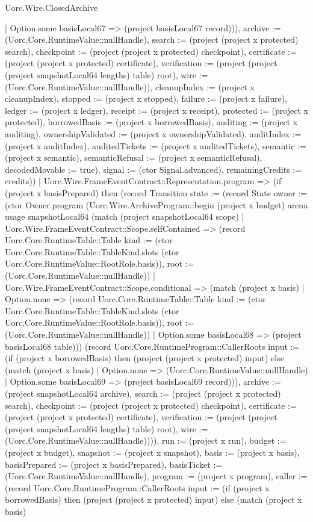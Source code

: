 \begin{lexlean}{Uorc.Wire.ClosedArchive}
\begin{semanticmodule}
{{{{          | Option.some basisLocal67 => (project basisLocal67 record))), archive := (Uorc.Core.RuntimeValue::nullHandle), search := (project (project x protected) search), checkpoint := (project (project x protected) checkpoint), certificate := (project (project x protected) certificate), verification := (project (project (project snapshotLocal64 lengths) table) root), wire := (Uorc.Core.RuntimeValue::nullHandle)}), cleanupIndex := (project x cleanupIndex), stopped := (project x stopped), failure := (project x failure), ledger := (project x ledger), receipt := (project x receipt), protected := (project x protected), borrowedBasis := (project x borrowedBasis), auditing := (project x auditing), ownershipValidated := (project x ownershipValidated), auditIndex := (project x auditIndex), auditedTickets := (project x auditedTickets), semantic := (project x semantic), semanticRefusal := (project x semanticRefusal), decodedMovable := true}), signal := (ctor Signal.advanced), remainingCredits := credits}))
      | Uorc.Wire.FrameEventContract::Representation.program => (if (project x basisPrepared) then (record Transition {state := (record State {owner := (ctor Owner.program (Uorc.Wire.ArchiveProgram::begin (project x budget) arena usage snapshotLocal64 (match (project snapshotLocal64 scope)
        | Uorc.Wire.FrameEventContract::Scope.selfContained => (record Uorc.Core.RuntimeTable::Table {kind := (ctor Uorc.Core.RuntimeTable::TableKind.slots (ctor Uorc.Core.RuntimeValue::RootRole.basis)), root := (Uorc.Core.RuntimeValue::nullHandle)})
        | Uorc.Wire.FrameEventContract::Scope.conditional => (match (project x basis)
          | Option.none => (record Uorc.Core.RuntimeTable::Table {kind := (ctor Uorc.Core.RuntimeTable::TableKind.slots (ctor Uorc.Core.RuntimeValue::RootRole.basis)), root := (Uorc.Core.RuntimeValue::nullHandle)})
          | Option.some basisLocal68 => (project basisLocal68 table))) (record Uorc.Core.RuntimeProgram::CallerRoots {input := (if (project x borrowedBasis) then (project (project x protected) input) else (match (project x basis)
        | Option.none => (Uorc.Core.RuntimeValue::nullHandle)
        | Option.some basisLocal69 => (project basisLocal69 record))), archive := (project snapshotLocal64 archive), search := (project (project x protected) search), checkpoint := (project (project x protected) checkpoint), certificate := (project (project x protected) certificate), verification := (project (project (project snapshotLocal64 lengths) table) root), wire := (Uorc.Core.RuntimeValue::nullHandle)}))), run := (project x run), budget := (project x budget), snapshot := (project x snapshot), basis := (project x basis), basisPrepared := (project x basisPrepared), basisTicket := (Uorc.Core.RuntimeValue::nullHandle), program := (project x program), caller := (record Uorc.Core.RuntimeProgram::CallerRoots {input := (if (project x borrowedBasis) then (project (project x protected) input) else (match (project x basis)
}}}}
\end{semanticmodule}
\end{lexlean}
